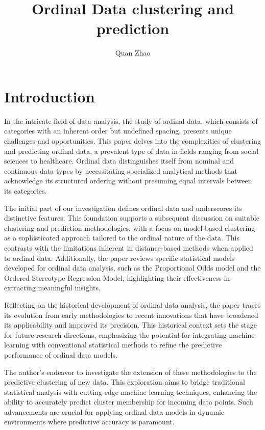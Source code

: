 \documentclass{article}
\begin{document}
\title{Ordinal Data clustering and prediction}

\author{Quan Zhao}

\maketitle

\section{Introduction}

In the intricate field of data analysis, the study of ordinal data, which consists of categories with an inherent order but undefined spacing, presents unique challenges and opportunities. This paper delves into the complexities of clustering and predicting ordinal data, a prevalent type of data in fields ranging from social sciences to healthcare. Ordinal data distinguishes itself from nominal and continuous data types by necessitating specialized analytical methods that acknowledge its structured ordering without presuming equal intervals between its categories.

The initial part of our investigation defines ordinal data and underscores its distinctive features. This foundation supports a subsequent discussion on suitable clustering and prediction methodologies, with a focus on model-based clustering as a sophisticated approach tailored to the ordinal nature of the data. This contrasts with the limitations inherent in distance-based methods when applied to ordinal data. Additionally, the paper reviews specific statistical models developed for ordinal data analysis, such as the Proportional Odds model and the Ordered Stereotype Regression Model, highlighting their effectiveness in extracting meaningful insights.

Reflecting on the historical development of ordinal data analysis, the paper traces its evolution from early methodologies to recent innovations that have broadened its applicability and improved its precision. This historical context sets the stage for future research directions, emphasizing the potential for integrating machine learning with conventional statistical methods to refine the predictive performance of ordinal data models.

The author's endeavor to investigate the extension of these methodologies to the predictive clustering of new data. 
This exploration aims to bridge traditional statistical analysis with cutting-edge machine learning techniques, enhancing the ability to accurately predict cluster membership for incoming data points. 
Such advancements are crucial for applying ordinal data models in dynamic environments where predictive accuracy is paramount.
\end{document}
